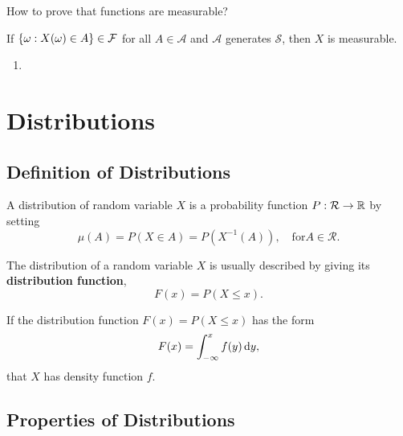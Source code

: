 How to prove that functions are measurable?

\begin{theorem}
	If $\{\omega:X(\omega)\in A\}\in{\mathcal F}$ for all $A\in\mathcal{A}$ and $\mathcal{A}$ generates $\mathcal{S}$, then $X$ is measurable.
\end{theorem}

\begin{enumerate}
	\item
\end{enumerate}

\section{Distributions}

\subsection{Definition of Distributions}

\begin{definition}[Distribution]
	A distribution of random variable $X$ is a probability function $P:\mathcal{R}\rightarrow{\mathbb R}$ by setting
	\begin{equation}
		\mu(A)=P(X\in A)=P\left(X^{-1}(A)\right),\quad\text{for}A\in\mathcal{R}.
	\end{equation}
\end{definition}

\begin{definition}
	The distribution of a random variable $X$ is usually described by giving its \textbf{distribution function},
	\begin{equation}
		F(x)=P(X\leq x).
	\end{equation}
\end{definition}

\begin{definition}
	If the distribution function $F(x)=P(X\leq x)$ has the form
	\begin{equation*}
		F(x)=\int_{-\infty}^{x}f(y)\mathop{}\!\mathrm{d} y,
	\end{equation*}
	that $X$ has density function $f$.
\end{definition}

\subsection{Properties of Distributions}

